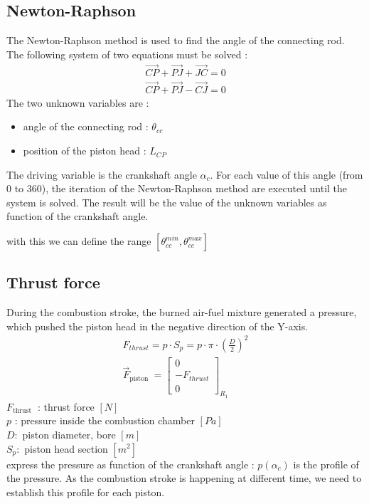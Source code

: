 \documentclass[12pt,a4paper]{article}
\begin{document}
	\subsection{Newton-Raphson}
	The Newton-Raphson method is used to find the angle of the connecting rod. The following system of two equations must be solved : 
	\begin{eqnarray}
		\vec{CP} + \vec{PJ} + \vec{JC} = 0\\
		\vec{CP} + \vec{PJ} - \vec{CJ} = 0
	\end{eqnarray} 
	The two unknown variables are : 
	\begin{itemize}
		\item angle of the connecting rod : $\theta_{cc}$
		\item position of the piston head : $L_{CP}$
	\end{itemize}
	The driving variable is the crankshaft angle $\alpha_c$.
	For each value of this angle (from 0 to 360), the iteration of the Newton-Raphson method are executed until the system is solved. 
	The result will be the value of the unknown variables as function of the crankshaft angle. 
		
	with this we can define the range $[\theta_{cc}^{min}, \theta_{cc}^{max}]$
	 
	\subsection{Thrust force}
	During the combustion stroke, the burned air-fuel mixture generated a pressure, which pushed the piston head in the negative direction of the Y-axis.
	\begin{gather*}
		F_{thrust}=p \cdot S_{p}=p \cdot \pi \cdot\left(\frac{D}{2}\right)^{2}  \tag{2}\\
		\vec{F}_{\text {piston }}=\left[\begin{array}{c}
			0 \\
			- F_{thrust} \\
			0
		\end{array}\right]_{R_{1}} \tag{3}
	\end{gather*}
	$F_{\text {thrust }}$ : thrust force $[N]$\\
	$p$ : pressure inside the combustion chamber $[P a]$\\
	$D:$ piston diameter, bore $[m]$\\
	$S_{p}:$ piston head section $\left[m^{2}\right]$\\
	
	express the pressure as function of the crankshaft angle : $p(\alpha_c)$ is the profile of the pressure. As the combustion stroke is happening at different time, we need to establish this profile for each piston.  
	
\end{document}
